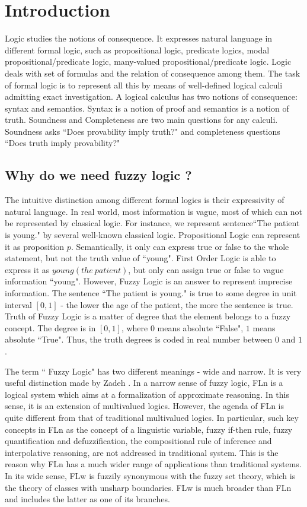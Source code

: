 \documentclass[Thesis.tex]{subfiles}
\begin{document}
\chapter{Introduction}
\label{chap:Introduction}
Logic studies the notions of consequence. It expresses natural language in different formal logic, such as propositional logic, predicate logics, modal propositional/predicate logic, many-valued propositional/predicate logic. Logic deals with set of formulas and the relation of consequence among them. The task of formal logic is to represent all this by means of well-defined logical calculi admitting exact investigation. A logical calculus has two notions of consequence: syntax and semantics. Syntax is a notion of proof and semantics is a notion of truth. Soundness and Completeness are two main questions for any calculi. Soundness asks ``Does provability imply truth?" and completeness questions ``Does truth imply provability?"

\section{Why do we need fuzzy logic ?}
The intuitive distinction among different formal logics is their expressivity of natural language. In real world, most information is vague, most of which can not be represented by classical logic. For instance, we represent sentence``The patient is young." by several well-known classical logic. Propositional Logic can represent it as proposition $p$. Semantically, it only can express true or false to the whole statement, but not the truth value of ``young". First Order Logic is able to express it as $young(the\ patient)$, but only can assign true or false to vague information ``young". However, Fuzzy Logic is an answer to represent imprecise information. The sentence ``The patient is young." is true to some degree in unit interval $[0,1]$ - the lower the age of the patient, the more the sentence is true. Truth of Fuzzy Logic is a matter of degree that the element belongs to a fuzzy concept. The degree is in $[0,1]$, where $0$ means absolute ``False", $1$ means absolute ``True". Thus, the truth degrees is coded in real number between $0$ and $1$.

The term `` Fuzzy Logic" has two different meanings - wide and narrow. It is very useful distinction made by Zadeh \cite{Z96}. In a narrow sense of fuzzy logic, FLn is a logical system which aims at a formalization of  approximate reasoning. In this sense, it is an extension of multivalued logics. 
However, the agenda of FLn is quite different from that of traditional multivalued logics. In particular, such key concepts in FLn as the concept of a linguistic variable, fuzzy if-then rule, fuzzy quantification and defuzzification, the compositional rule of inference and interpolative reasoning, are not addressed in traditional system. This is the reason why FLn has a much wider range of applications than traditional systems. In its wide sense, FLw is fuzzily synonymous with the fuzzy set theory, which is the theory of classes with unsharp boundaries. FLw is much broader than FLn and includes the latter as one of its branches.
\end{document}
